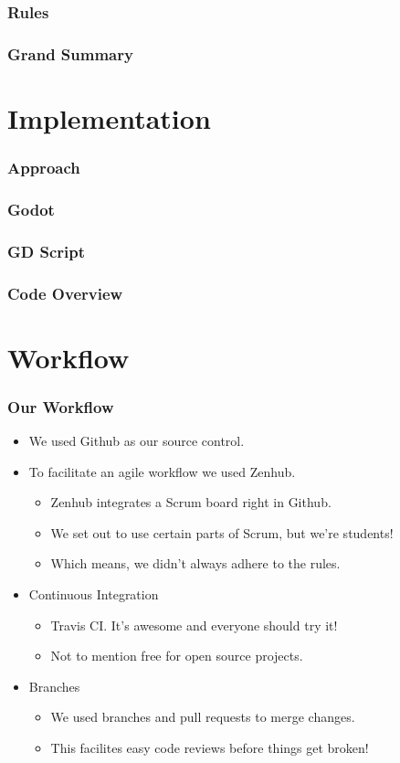 \documentclass{beamer}
\begin{document}
\begin{frame}
    \frametitle{Rules} %
\end{frame}

\begin{frame}
    \frametitle{Grand Summary} %
\end{frame}


\section{Implementation}
\begin{frame}
  \frametitle{Approach} %
\end{frame}

\begin{frame}
    \frametitle{Godot} %
\end{frame}

\begin{frame}
    \frametitle{GD Script} %
\end{frame}

\begin{frame}
    \frametitle{Code Overview} %
\end{frame}


\section{Workflow} %
\begin{frame}
    \frametitle{Our Workflow} 
    \begin{itemize}
    		\pause \item We used Github as our source control.
    		\pause \item To facilitate an agile workflow we used Zenhub.
    		\begin{itemize}
    		\pause \item Zenhub integrates a Scrum board right in Github.
    		\pause \item We set out to use certain parts of Scrum, but we're students!
    		\pause \item Which means, we didn't always adhere to the rules.
    		\end{itemize}
    		\pause \item Continuous Integration
    		\begin{itemize}
    			\pause \item Travis CI. It's awesome and everyone should try it!
    			\pause \item Not to mention free for open source projects. 
    		\end{itemize}
    		\pause \item Branches
    		\begin{itemize}
    			\pause \item We used branches and pull requests to merge changes.
    			\pause \item This facilites easy code reviews before things get broken!
    		\end{itemize}
    \end{itemize}
\end{frame}
\end{document}
